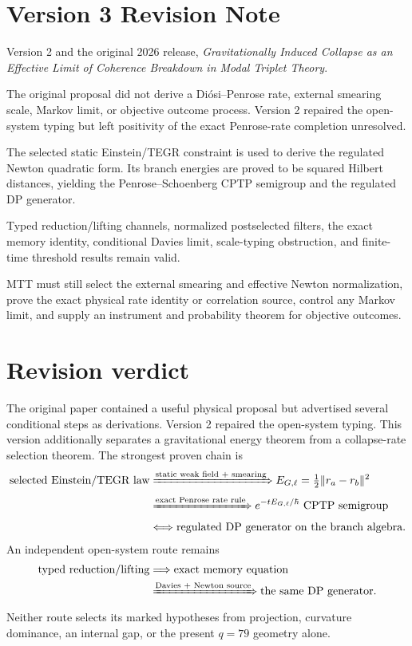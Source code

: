\documentclass[11pt]{article}
\begin{document}
\section*{Version 3 Revision Note}
\begingroup
\small
\begin{description}[leftmargin=3.2cm,style=nextline,itemsep=1pt,topsep=3pt]
\item[Supersedes] Version 2 and the original 2026 release,
\emph{Gravitationally Induced Collapse as an Effective Limit of Coherence
Breakdown in Modal Triplet Theory}.
\item[Reason] The original proposal did not derive a Di\'osi--Penrose rate,
external smearing scale, Markov limit, or objective outcome process.
Version 2 repaired the open-system typing but left positivity of the exact
Penrose-rate completion unresolved.
\item[Resolution] The selected static Einstein/TEGR constraint is used to
derive the regulated Newton quadratic form. Its branch energies are proved
to be squared Hilbert distances, yielding the Penrose--Schoenberg CPTP
semigroup and the regulated DP generator.
\item[Retained result] Typed reduction/lifting channels, normalized
postselected filters, the exact memory identity, conditional Davies limit,
scale-typing obstruction, and finite-time threshold results remain valid.
\item[Remaining boundary] MTT must still select the external smearing and
effective Newton normalization, prove the exact physical rate identity or
correlation source, control any Markov limit, and supply an instrument and
probability theorem for objective outcomes.
\end{description}
\endgroup

\tableofcontents

\section{Revision verdict}

The original paper contained a useful physical proposal but advertised several
conditional steps as derivations. Version 2 repaired the open-system typing. This
version additionally separates a gravitational energy theorem from a collapse-rate
selection theorem. The strongest proven chain is
\begin{align*}
\text{selected Einstein/TEGR law}
&\xRightarrow{\text{static weak field + smearing}} E_{G,\ell}
   =\tfrac12\|r_a-r_b\|^2\\
&\xRightarrow{\text{exact Penrose rate rule}}
   e^{-tE_{G,\ell}/\hbar}\ \text{CPTP semigroup}\\
&\Longleftrightarrow \text{regulated DP generator on the branch algebra}.
\end{align*}
An independent open-system route remains
\begin{align*}
 \text{typed reduction/lifting}
 &\Longrightarrow\text{exact memory equation}\\
 &\xRightarrow{\text{Davies + Newton source}}
 \text{the same DP generator}.
\end{align*}
Neither route selects its marked hypotheses from projection, curvature dominance,
an internal gap, or the present $q=79$ geometry alone.
\end{document}
